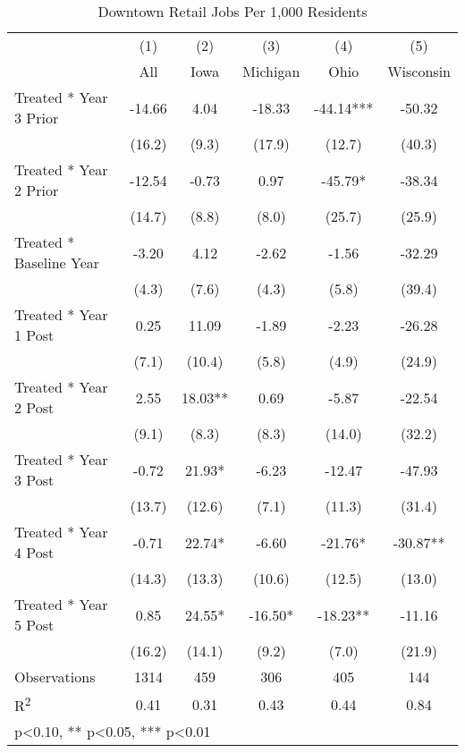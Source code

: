 \begin{table}[htbp]\centering
\def\sym#1{\ifmmode^{#1}\else\(^{#1}\)\fi}
\caption{Downtown Retail Jobs Per 1,000 Residents}
\begin{tabular}{l*{5}{c}}
\toprule
            &\multicolumn{1}{c}{(1)}   &\multicolumn{1}{c}{(2)}   &\multicolumn{1}{c}{(3)}   &\multicolumn{1}{c}{(4)}   &\multicolumn{1}{c}{(5)}   \\
            &         All   &        Iowa   &    Michigan   &        Ohio   &   Wisconsin   \\
\midrule
Treated * Year 3 Prior&      -14.66   &        4.04   &      -18.33   &      -44.14***&      -50.32   \\
            &      (16.2)   &       (9.3)   &      (17.9)   &      (12.7)   &      (40.3)   \\
Treated * Year 2 Prior&      -12.54   &       -0.73   &        0.97   &      -45.79*  &      -38.34   \\
            &      (14.7)   &       (8.8)   &       (8.0)   &      (25.7)   &      (25.9)   \\
Treated * Baseline Year&       -3.20   &        4.12   &       -2.62   &       -1.56   &      -32.29   \\
            &       (4.3)   &       (7.6)   &       (4.3)   &       (5.8)   &      (39.4)   \\
Treated * Year 1 Post&        0.25   &       11.09   &       -1.89   &       -2.23   &      -26.28   \\
            &       (7.1)   &      (10.4)   &       (5.8)   &       (4.9)   &      (24.9)   \\
Treated * Year 2 Post&        2.55   &       18.03** &        0.69   &       -5.87   &      -22.54   \\
            &       (9.1)   &       (8.3)   &       (8.3)   &      (14.0)   &      (32.2)   \\
Treated * Year 3 Post&       -0.72   &       21.93*  &       -6.23   &      -12.47   &      -47.93   \\
            &      (13.7)   &      (12.6)   &       (7.1)   &      (11.3)   &      (31.4)   \\
Treated * Year 4 Post&       -0.71   &       22.74*  &       -6.60   &      -21.76*  &      -30.87** \\
            &      (14.3)   &      (13.3)   &      (10.6)   &      (12.5)   &      (13.0)   \\
Treated * Year 5 Post&        0.85   &       24.55*  &      -16.50*  &      -18.23** &      -11.16   \\
            &      (16.2)   &      (14.1)   &       (9.2)   &       (7.0)   &      (21.9)   \\
\midrule
Observations &        1314   &         459   &         306   &         405   &         144   \\
R\textsuperscript{2} &        0.41   &        0.31   &        0.43   &        0.44   &        0.84   \\
\bottomrule
\multicolumn{6}{l}{\footnotesize * p<0.10, ** p<0.05, *** p<0.01}\\
\end{tabular}
\end{table}
